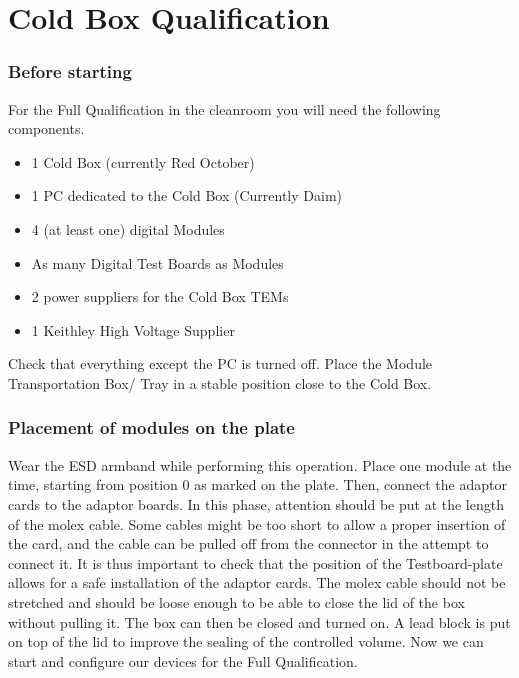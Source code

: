 \documentclass[fleqn,10pt]{SelfArx} %
\date{\today}
\begin{document}
\flushbottom %

\maketitle %

\tableofcontents %

\thispagestyle{empty} %

\newpage
\part{Cold Box Qualification}
\section{Before starting}
For the Full Qualification in the cleanroom you will need the following components.
\begin{itemize}
\item 1 Cold Box (currently Red October)
\item 1 PC dedicated to the Cold Box (Currently Daim)
\item 4 (at least one) digital Modules
\item As many Digital Test Boards as Modules
\item 2 power suppliers for the Cold Box TEMs 
\item 1 Keithley High Voltage Supplier
\end{itemize}
Check that everything except the PC is turned off. Place the Module Transportation Box/ Tray in a stable position close to the Cold Box.


\section{Placement of modules on the plate}
Wear the ESD armband while performing this operation. Place one module at the time, starting from position 0 as marked on the plate. Then, connect the adaptor cards to the adaptor boards. In this phase, attention should be put at the length of the molex cable. Some cables might be too short to allow a proper insertion of the card, and the cable can be pulled off from the connector in the attempt to connect it. It is thus important to check that the position of the Testboard-plate allows for a safe installation of the adaptor cards. The molex cable should not be stretched and should be loose enough to be able to close the lid of the box without pulling it. The box can then be closed and turned on. A lead block is put on top of the lid to improve the sealing of the controlled volume. Now we can start and configure our devices for the Full Qualification.
\end{document}
